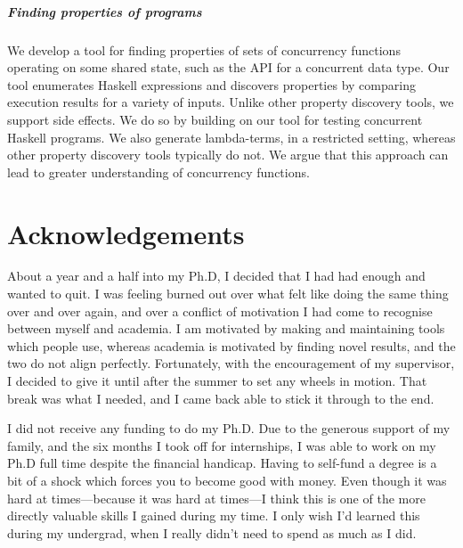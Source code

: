 \paragraph{Finding properties of programs}
We develop a tool for finding properties of sets of concurrency
functions operating on some shared state, such as the API for a
concurrent data type.  Our tool enumerates Haskell expressions and
discovers properties by comparing execution results for a variety of
inputs.  Unlike other property discovery tools, we support side
effects.  We do so by building on our tool for testing concurrent
Haskell programs.  We also generate lambda-terms, in a restricted
setting, whereas other property discovery tools typically do not.  We
argue that this approach can lead to greater understanding of
concurrency functions.

\makeatletter\renewcommand{}\makeatother
\tableofcontents
\listoffigures
\listoftables
\listoflistings

\chapter*{Acknowledgements}

About a year and a half into my Ph.D, I decided that I had had enough
and wanted to quit.  I was feeling burned out over what felt like
doing the same thing over and over again, and over a conflict of
motivation I had come to recognise between myself and academia.  I am
motivated by making and maintaining tools which people use, whereas
academia is motivated by finding novel results, and the two do not
align perfectly.  Fortunately, with the encouragement of my
supervisor, I decided to give it until after the summer to set any
wheels in motion.  That break was what I needed, and I came back able
to stick it through to the end.

I did not receive any funding to do my Ph.D.  Due to the generous
support of my family, and the six months I took off for internships, I
was able to work on my Ph.D full time despite the financial handicap.
Having to self-fund a degree is a bit of a shock which forces you to
become good with money.  Even though it was hard at times---because it
was hard at times---I think this is one of the more directly valuable
skills I gained during my time.  I only wish I'd learned this during
my undergrad, when I really didn't need to spend as much as I did.

